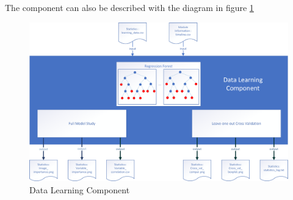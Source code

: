 \documentclass[a4paper,11pt]{report}
\numberwithin{figure}{chapter} %
\begin{document}
    The component can also be described with the diagram in figure \ref{fig:comp3}

     \begin{figure}[H]
      \centering
      \includegraphics[width=.9\linewidth]{diagrams/module3.png}
      \caption{Data Learning Component}
      \label{fig:comp3}
    \end{figure}
\end{document}
